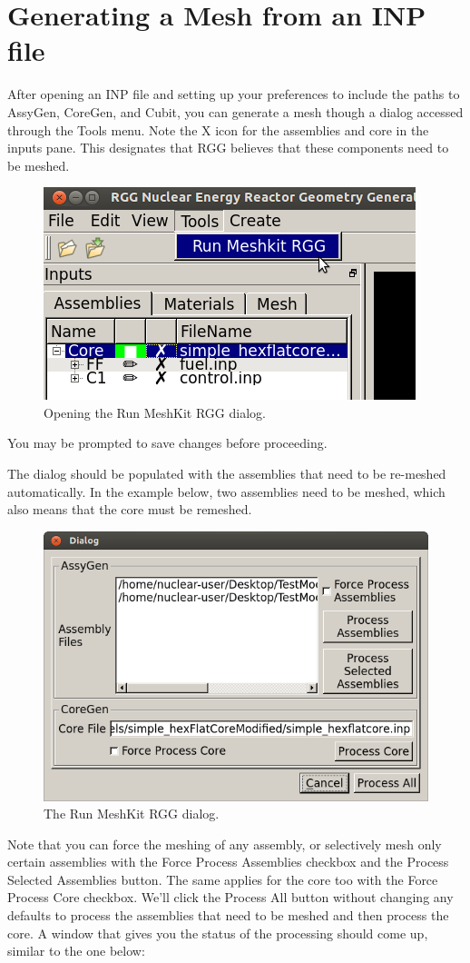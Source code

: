 \section{Generating a Mesh from an INP file}

After opening an INP file and setting up your preferences to include the paths to AssyGen, CoreGen, and Cubit, you can generate a mesh though a dialog accessed through the Tools menu.  Note the X icon for the assemblies and core in the inputs pane.  This designates that RGG believes that these components need to be meshed.

\begin{figure}[H]
	\begin{center}
		\includegraphics[width=0.5\linewidth]{Images/mesh-3.png}
		\caption{Opening the Run MeshKit RGG dialog.}
		\label{fig:Mesh3}
	\end{center}
\end{figure}

You may be prompted to save changes before proceeding.

The dialog should be populated with the assemblies that need to be re-meshed automatically.  In the example below, two assemblies need to be meshed, which also means that the core must be remeshed.

\begin{figure}[H]
	\begin{center}
		\includegraphics[width=0.5\linewidth]{Images/mesh-4.png}
		\caption{The Run MeshKit RGG dialog.}
		\label{fig:Mesh4}
	\end{center}
\end{figure}

Note that you can force the meshing of any assembly, or selectively mesh only certain assemblies with the Force Process Assemblies checkbox and the Process Selected Assemblies button.  The same applies for the core too with the Force Process Core checkbox.  We'll click the Process All button without changing any defaults to process the assemblies that need to be meshed and then process the core.  A window that gives you the status of the processing should come up, similar to the one below:

